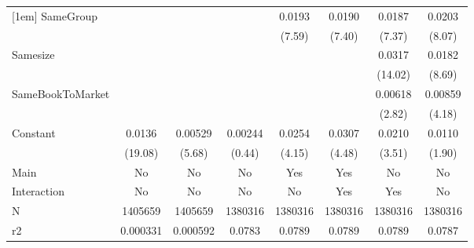 {\begin{tabular}{l*{7}{c}}
[1em]
SameGroup           &                     &                     &                     &      0.0193\sym{***}&      0.0190\sym{***}&      0.0187\sym{***}&      0.0203\sym{***}\\
                    &                     &                     &                     &      (7.59)         &      (7.40)         &      (7.37)         &      (8.07)         \\
[1em]
Samesize            &                     &                     &                     &                     &                     &      0.0317\sym{***}&      0.0182\sym{***}\\
                    &                     &                     &                     &                     &                     &     (14.02)         &      (8.69)         \\
[1em]
SameBookToMarket    &                     &                     &                     &                     &                     &     0.00618\sym{**} &     0.00859\sym{***}\\
                    &                     &                     &                     &                     &                     &      (2.82)         &      (4.18)         \\
[1em]
Constant            &      0.0136\sym{***}&     0.00529\sym{***}&     0.00244         &      0.0254\sym{***}&      0.0307\sym{***}&      0.0210\sym{***}&      0.0110         \\
                    &     (19.08)         &      (5.68)         &      (0.44)         &      (4.15)         &      (4.48)         &      (3.51)         &      (1.90)         \\
\hline
Main                &          No         &          No         &          No         &         Yes         &         Yes         &          No         &          No         \\
Interaction         &          No         &          No         &          No         &          No         &         Yes         &         Yes         &          No         \\
N                   &     1405659         &     1405659         &     1380316         &     1380316         &     1380316         &     1380316         &     1380316         \\
r2                  &    0.000331         &    0.000592         &      0.0783         &      0.0789         &      0.0789         &      0.0789         &      0.0787         \\

\end{tabular}}
